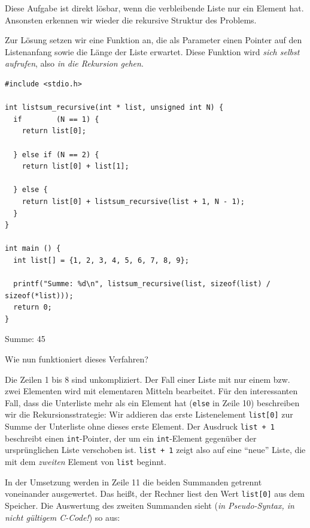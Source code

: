 Diese Aufgabe ist direkt lösbar, wenn die verbleibende Liste nur ein Element hat. Ansonsten erkennen wir wieder die rekursive Struktur des Problems.

Zur Lösung setzen wir eine Funktion an, die als Parameter einen Pointer auf den Listenanfang sowie die Länge der Liste erwartet. Diese Funktion wird \emph{sich selbst aufrufen}, also \emph{in die Rekursion gehen}.

\begin{codebox}
\begin{verbatim}
#include <stdio.h>

int listsum_recursive(int * list, unsigned int N) {
  if        (N == 1) {
    return list[0];
    
  } else if (N == 2) {
    return list[0] + list[1];
    
  } else {
    return list[0] + listsum_recursive(list + 1, N - 1);
  }
}

int main () {
  int list[] = {1, 2, 3, 4, 5, 6, 7, 8, 9};
  
  printf("Summe: %d\n", listsum_recursive(list, sizeof(list) / sizeof(*list)));
  return 0;
}
\end{verbatim}
\end{codebox}

\begin{cmdbox}
Summe: 45
\end{cmdbox}

Wie nun funktioniert dieses Verfahren?

Die Zeilen 1 bis 8 sind unkompliziert. Der Fall einer Liste mit nur einem bzw. zwei Elementen wird mit elementaren Mitteln bearbeitet. Für den interessanten Fall, dass die Unterliste mehr als ein Element hat (\texttt{else} in Zeile 10) beschreiben wir die Rekursionsstrategie: Wir addieren das erste Listenelement \texttt{list[0]} zur Summe der Unterliste ohne dieses erste Element. Der Ausdruck \texttt{list + 1} beschreibt einen \texttt{int}-Pointer, der um ein \texttt{int}-Element gegenüber der ursprünglichen Liste verschoben ist. \texttt{list + 1} zeigt also auf eine \enquote{neue} Liste, die mit dem \emph{zweiten} Element von \texttt{list} beginnt.

In der Umsetzung werden in Zeile 11 die beiden Summanden getrennt voneinander ausgewertet. Das heißt, der Rechner liest den Wert \texttt{list[0]} aus dem Speicher. Die Auswertung des zweiten Summanden sieht (\emph{in Pseudo-Syntax, \ie in nicht gültigem C-Code!}) so aus:

